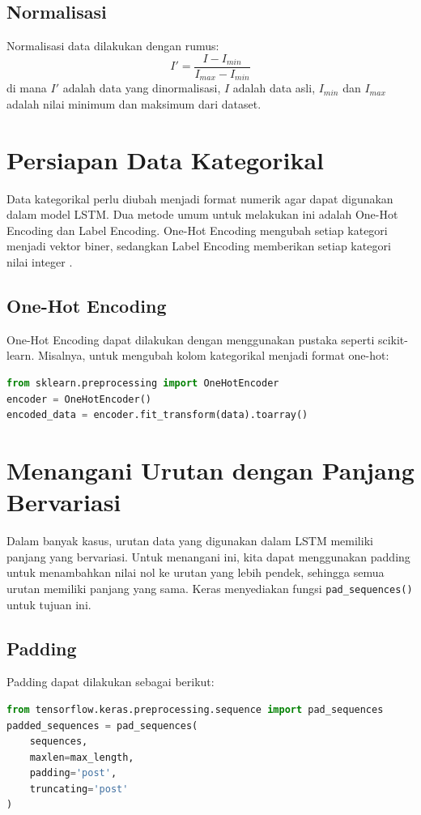 \subsection{Normalisasi}
\par Normalisasi data dilakukan dengan rumus:
\begin{equation}
    I' = \frac{I - I_{min}}{I_{max} - I_{min}}
\end{equation}
di mana $I'$ adalah data yang dinormalisasi, $I$ adalah data asli, $I_{min}$ dan $I_{max}$ adalah nilai minimum dan maksimum dari dataset.

\section{Persiapan Data Kategorikal}
\par Data kategorikal perlu diubah menjadi format numerik agar dapat digunakan dalam model LSTM. Dua metode umum untuk melakukan ini adalah One-Hot Encoding dan Label Encoding. One-Hot Encoding mengubah setiap kategori menjadi vektor biner, sedangkan Label Encoding memberikan setiap kategori nilai integer \citep{brownlee2017}.

\subsection{One-Hot Encoding}
\par One-Hot Encoding dapat dilakukan dengan menggunakan pustaka seperti scikit-learn. Misalnya, untuk mengubah kolom kategorikal menjadi format one-hot:
\begin{lstlisting}[language=Python, caption=Contoh One-Hot Encoding (scikit-learn)]
from sklearn.preprocessing import OneHotEncoder
encoder = OneHotEncoder()
encoded_data = encoder.fit_transform(data).toarray()
\end{lstlisting}

\section{Menangani Urutan dengan Panjang Bervariasi}
\par Dalam banyak kasus, urutan data yang digunakan dalam LSTM memiliki panjang yang bervariasi. Untuk menangani ini, kita dapat menggunakan padding untuk menambahkan nilai nol ke urutan yang lebih pendek, sehingga semua urutan memiliki panjang yang sama. Keras menyediakan fungsi \texttt{pad\_sequences()} untuk tujuan ini.

\subsection{Padding}
\par Padding dapat dilakukan sebagai berikut:
\begin{lstlisting}[language=Python, caption=Contoh Padding Sequence (Keras)]
from tensorflow.keras.preprocessing.sequence import pad_sequences
padded_sequences = pad_sequences(
    sequences, 
    maxlen=max_length, 
    padding='post', 
    truncating='post'
)
\end{lstlisting}

